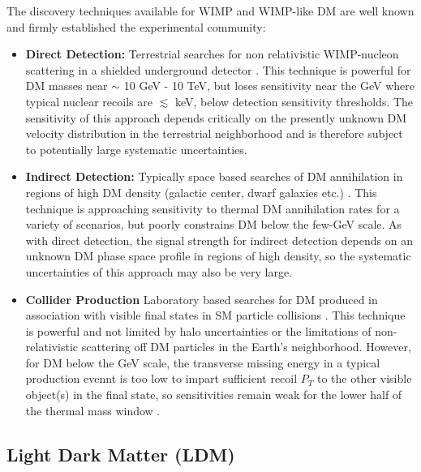 \documentclass{article}
\begin{document}
The discovery techniques available for WIMP and WIMP-like DM are well known and firmly established the experimental community:
\begin{itemize}
\item {\bf Direct Detection:} Terrestrial searches for non relativistic WIMP-nucleon scattering in a shielded underground detector \cite{Undagoitia:2015gya}. This technique 
is powerful for DM masses near $\sim$ 10 GeV - 10 TeV, but loses sensitivity near the GeV where typical nuclear recoils are $\lesssim$ keV,
below detection sensitivity thresholds. The sensitivity of this approach depends critically on the presently unknown DM velocity distribution in the 
terrestrial neighborhood and is therefore subject to potentially large systematic uncertainties. 

\item {\bf Indirect Detection:} Typically space based searches of DM annihilation in regions of high DM density (galactic center, dwarf galaxies etc.) \cite{Conrad:2014tla}.
This technique is approaching sensitivity to thermal DM annihilation rates for a variety of scenarios, but poorly constrains DM below the 
few-GeV scale. As with direct detection, the signal strength for indirect detection depends on an unknown DM phase space profile in regions of high density, 
so the systematic uncertainties of this approach may also be very large. 

\item {\bf Collider Production} Laboratory based searches for DM produced in association with visible final states in SM particle collisions \cite{Askew:2014kqa}. This technique
is powerful and not limited by halo uncertainties or the limitations of non-relativistic scattering off DM particles in the Earth's neighborhood. However, 
for DM below the GeV scale, the transverse missing energy in a typical production evennt is too low to impart sufficient recoil $P_T$ to the other
visible object(s) in the final state, so sensitivities remain weak for the lower half of the thermal mass window \cite{Izaguirre:2015yja}. 

\end{itemize}

\subsection{Light Dark Matter (LDM)}
\end{document}
